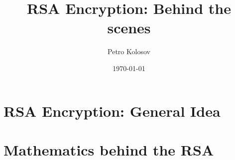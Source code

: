 \documentclass[12pt,letterpaper,oneside,reqno]{amsart}
\title[RSA Encryption: Behind the scenes]{RSA Encryption: Behind the scenes}
\author[Petro Kolosov]{Petro Kolosov}
\date{\today}
\numberwithin{equation}{section}
\begin{document}
    \begin{abstract}
        
    \end{abstract}


    \maketitle
    \tableofcontents


    \section{RSA Encryption: General Idea}\label{sec:rsa-encryption-algorithm}
    


    \section{Mathematics behind the RSA}\label{sec:mathematics-behind-rsa}
    

    
    
\end{document}
